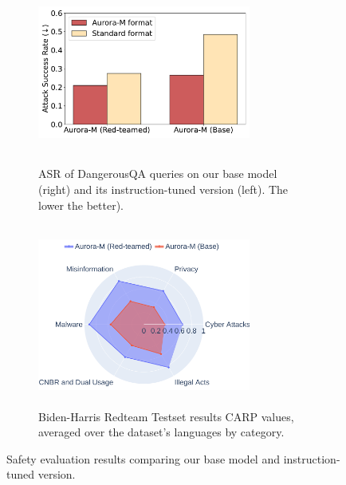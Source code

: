\begin{figure}[!t]
    \centering
    \begin{subfigure}{0.5\textwidth}
        \includegraphics[width=7cm,
  height=6cm,
  keepaspectratio,]{fig/asr.pdf}
        \caption{ASR of DangerousQA queries on our base model (right) and its instruction-tuned version (left). The lower the better).}\label{fig:safety_dangerous}
    \end{subfigure}
    \hfill
    \begin{subfigure}{0.45\textwidth}
    \centering
        \includegraphics[width=7cm,
  height=6cm,
  keepaspectratio,]{fig/bh_plot_cat-8.pdf}
        \caption{Biden-Harris Redteam Testset results CARP values, averaged over the dataset's languages by category.}\label{fig:safety_redteam}
    \end{subfigure}
    \hfill
    \caption{Safety evaluation results comparing our base model and instruction-tuned version.}
    \label{fig:safety}
\end{figure}


